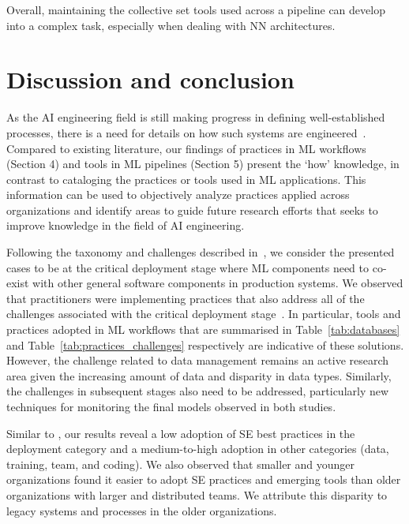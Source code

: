 \documentclass{IEEEcsmag}
\begin{document}
Overall, maintaining the collective set tools used across a pipeline can develop into a complex task, especially when dealing with NN architectures.






 




\label{sec:challenges}


 

\section{\textbf{Discussion and conclusion}}
\label{sec:discussion}









As the AI engineering field is still making progress in defining well-established processes, there is a need for details on how such systems are engineered~\cite{9121629}. Compared to existing literature, our findings of practices in ML workflows (Section 4) and tools in ML pipelines (Section 5) present the ‘how’ knowledge, in contrast to cataloging the practices or tools used in ML applications. This information can be used to objectively analyze practices applied across organizations and identify areas to guide future research efforts that seeks to improve knowledge in the field of AI engineering.

Following the taxonomy and challenges described in~\cite{Lwakatare2019}, we consider the presented cases to be at the critical deployment stage where ML components need to co-exist with other general software components in production systems. We observed that practitioners were implementing practices that also address all of the challenges associated with the critical deployment stage~\cite{Lwakatare2019}. In particular, tools and practices adopted in ML workflows that are summarised in Table~\ref{tab:databases} and Table~\ref{tab:practices_challenges} respectively are indicative of these solutions. However, the challenge related to data management remains an active research area given the increasing amount of data and disparity in data types. Similarly, the challenges in subsequent stages also need to be addressed, particularly new techniques for monitoring the final models observed in both studies.

Similar to \cite{Serban2020Practices}, our results reveal a low adoption of SE best practices in the deployment category and a medium-to-high adoption in other categories (data, training, team, and coding). We also observed that smaller and younger organizations found it easier to adopt SE practices and emerging tools than older organizations with larger and distributed teams. We attribute this disparity to legacy systems and processes in the older organizations.
\end{document}
